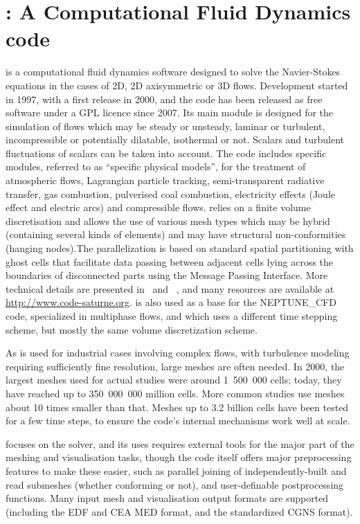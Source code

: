 \section{\CS: A Computational Fluid Dynamics code}
\label{sec:cs}
\CS is a computational fluid dynamics software designed to solve the
Navier-Stokes equations in the cases of 2D, 2D axisymmetric or 3D
flows. Development started in 1997, with a first release in 2000, and the
code has been released as free software under a GPL licence since 2007.
Its main module is designed for the simulation of flows which may be
steady or unsteady, laminar or turbulent, incompressible or potentially
dilatable, isothermal or not. Scalars and turbulent fluctuations of scalars can
be taken into account. The code includes specific modules, referred to as
``specific physical models'', for the treatment of atmospheric flows, Lagrangian particle
tracking, semi-transparent radiative transfer, gas combustion, pulverised coal
combustion, electricity effects (Joule effect and electric arcs) and
compressible flows. \CS relies on a finite volume discretisation and
allows the use of various mesh types which may be hybrid (containing several
kinds of elements) and may have structural non-conformities (hanging nodes).The
parallelization is based on standard spatial partitioning with ghost cells
that facilitate data passing between adjacent cells lying across the boundaries
of disconnected parts using the Message Passing Interface. More
technical details are presented in~\cite{cs2004} and ~\cite{userguide},
and many resources are available at \url{http://www.code-saturne.org}.
\CS is also used as a base for the NEPTUNE\_CFD code, specialized in
multiphase flows, and which uses a different time stepping scheme,
but mostly the same volume discretization scheme.

As \CS is used for industrial cases involving complex flows, with turbulence
modeling requiring sufficiently fine resolution, large meshes are often
needed. In 2000, the largest meshes used for actual studies were around
1~500~000 cells; today, they have reached up to 350~000~000 million cells.
More common studies use meshes about 10 times smaller than that.
Meshes up to 3.2 billion cells have been tested for a few time steps, to
ensure the code's internal mechanisms work well at scale.

\CS focuses on the solver, and its uses requires external tools for the
major part of the meshing and visualisation tasks, though the code itself offers
major preprocessing features to make these easier, such as parallel joining
of independently-built and read submeshes (whether conforming or not),
and user-definable postprocessing functions. Many input mesh and visualisation
output formats are supported (including the EDF and CEA MED format,
and the standardized CGNS format).

